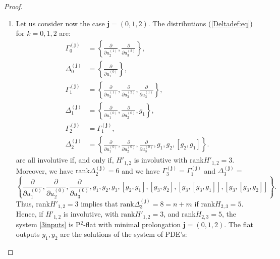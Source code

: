 \documentclass[10pt]{article}
\newcommand{\3}{\mathbf{3}}
\newcommand{\2}{\mathbf{2}}
\newcommand{\1}{\mathbf{1}}
\newcommand{\0}{\mathbf{0}}
\newcommand{\bj}{\mathbf{j}}
\newcommand{\mbf}[1]{\mathbf{#1}}
\newcommand{\rk}{\mathrm{rank}}
\newcommand{\ddu}[2]{\frac{\partial}{\partial u_{#1}^{(#2)}}}
\begin{document}
\begin{proof}
\begin{enumerate}
Therefore, the system is P$^2$-flat with an order one prolongation of $u_3$ and the flat outputs $y_1,y_2,y_3$ are the solutions of the system of PDE's:

\[ \left< G_{1}^{(\bj)},  dy_{i} \right>= 0 \]

or, equivalently, the flat outputs must be independent of $u_1^{(0)},u_2^{(0)},u_3^{(0)}$ and must be the solution of the system of PDE's

\[ \left< H_{0,2},  dy_{i} \right>= 0 \]

Remark that, by the Frobenius theorem, there exists $y_1,y_2,y_3$ independent solutions of this system of linear partial differential equations since, by assumption, $H_{0,2}$ is an involutive distribution.


\item Let us consider now the case $\mbf{j}=(0,1,2)$. The distributions (\ref{Deltadef:eq}) for $k=0,1,2$ are:
\begin{equation}
\begin{aligned}
\Gamma_{0}^{(\mbf{j})} &= \left\{ \ddu{2}{1},\ddu{3}{2} \right\},\\
\Delta_{0}^{(\mbf{j})} &= \left\{\ddu{1}{0}\right\},\\
\Gamma_{1}^{(\mbf{j})} &= \left\{ \ddu{2}{1},\ddu{3}{2}, \ddu{3}{1} \right\},\\
\Delta_{1}^{(\mbf{j})} &= \left\{\ddu{1}{0}, \ddu{2}{0},  g_{1} \right\},\\
\Gamma_{2}^{(\mbf{j})} &= \Gamma_{1}^{(\mbf{j})}, \\
\Delta_{2}^{(\mbf{j})} &= \left\{\ddu{1}{0}, \ddu{2}{0}, \ddu{3}{0}, g_{1}, g_{2}, [g_{2},g_{1}]\right\}.
\end{aligned}
\end{equation}
are all involutive if, and only if, $H'_{1,2}$ is involutive with $\rk H'_{1,2} = 3$.  Moreover, we have $\rk \Delta_{2}^{(\mbf{j})} = 6$ and we have $\Gamma_{3}^{(\mbf{j})} = \Gamma_{1}^{(\mbf{j})}$ and $\Delta_{3}^{(\mbf{j})}=$
$$\left\{\ddu{1}{0}, \ddu{2}{0}, \ddu{3}{0}, g_{1}, g_{2}, g_{3}, [g_{2},g_{1}], [g_{3},g_{2}], [g_{3},[g_{3},g_{1}]], [g_{3},[g_{3},g_{2}]] \right\}.$$
Thus, $\rk H'_{1,2} = 3$ implies that  $\rk \Delta_{3}^{(\mbf{j})} = 8= n+m$ if $\rk H_{2,3} = 5$. \\
Hence, if $H'_{1,2}$ is involutive, with $\rk H' _{1,2} = 3$, and $\rk H_{2,3} = 5$, the system \eqref{3inputs} is P$^{2}$-flat with minimal prolongation $\mbf{j}=(0,1,2)$. The flat outputs $y_1,y_2$ are the solutions of the system of PDE's:


\end{enumerate}
\end{proof}
\end{document}
